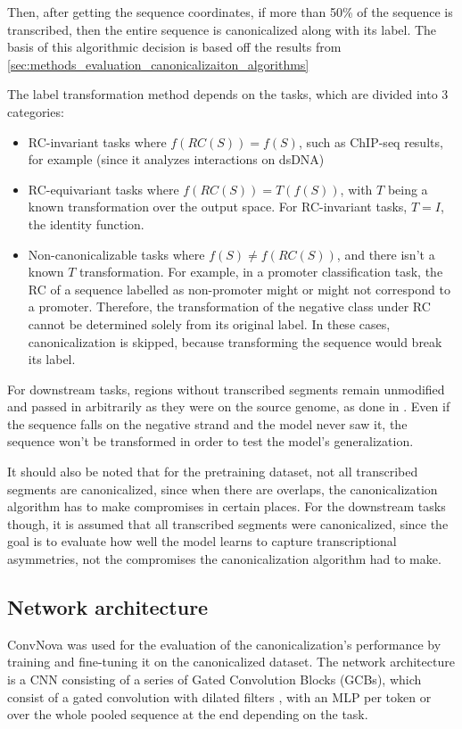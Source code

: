 \documentclass[   ]{article}
\begin{document}
Then, after getting the sequence coordinates, if more than 50\% of the sequence is transcribed, then the entire sequence is canonicalized along with its label. The basis of this algorithmic decision is based off the results from \ref{sec:methods_evaluation_canonicalizaiton_algorithms}

The label transformation method depends on the tasks, which are divided into 3 categories:
\begin{itemize}
	\item RC-invariant tasks where \(f(RC(S))=f(S)\), such as ChIP-seq results, for example (since it analyzes interactions on dsDNA)
	\item RC-equivariant tasks where \(f(RC(S))=T(f(S))\), with \(T\) being a known transformation over the output space. For RC-invariant tasks, $T=I$, the identity function. 
	\item Non-canonicalizable tasks where $f(S)\neq f(RC(S))$, and there isn't a known $T$ transformation. For example, in a promoter classification task, the RC of a sequence labelled as
	non-promoter might or might not correspond to a promoter. Therefore, the
	transformation of the negative class under RC cannot be determined
	solely from its original label. In these cases, canonicalization is skipped, because transforming the sequence would break its label.
\end{itemize}

For downstream tasks, regions without transcribed segments remain unmodified and passed in arbitrarily as they were on the source genome, as done in \citet{boRevisitingConvolutionArchitecture2025}. Even if the sequence falls on the negative strand and the model never saw it, the sequence won't be transformed in order to test the model's generalization.

It should also be noted that for the pretraining dataset, not all transcribed segments are
canonicalized, since when there are overlaps, the canonicalization
algorithm has to make compromises in certain places. For the downstream tasks though, it is
assumed that all transcribed segments were canonicalized, since the goal
is to evaluate how well the model learns to capture transcriptional
asymmetries, not the compromises the canonicalization algorithm had to
make.

\subsection{Network architecture}
\label{sec:methods_convnova}
ConvNova was used for the evaluation of the canonicalization's performance by training and fine-tuning it on the canonicalized dataset. The network architecture is a CNN consisting of a series of Gated Convolution Blocks (GCBs), which consist of a gated convolution \citep{yuFreeFormImageInpainting2019} with dilated filters
\citep{yuMultiScaleContextAggregation2016}, with an MLP per token or over the whole pooled sequence at the end depending on the task.
\end{document}
